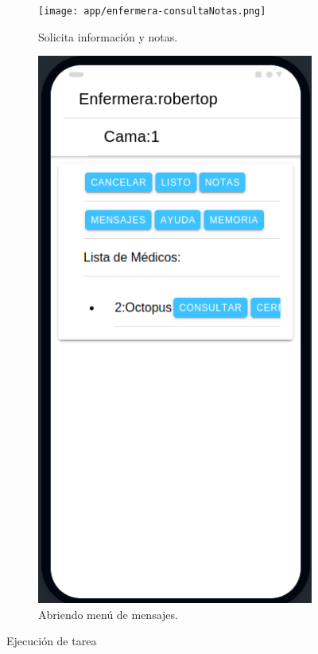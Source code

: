 \begin{figure}[!htpb]
\begin{subfigure}[b]{0.3\textwidth}
     \end{subfigure}
     \hfill
     \begin{subfigure}[b]{0.3\textwidth}
         \centering
         \texttt{[image: app/enfermera-consultaNotas.png]}
         \caption{Solicita información y notas.}
         \label{fig_3:2de3}
     \end{subfigure}
     \hfill
     \begin{subfigure}[b]{0.3\textwidth}
         \centering
         \includegraphics[width=.95\textwidth]{./Figures/app/enfermera-msg.png}
         \caption{Abriendo menú de mensajes.}
         \label{fig_3:3de3}
     \end{subfigure}
        \caption{Ejecución de tarea}
        \label{fig_3:three graphs}
\end{figure}

